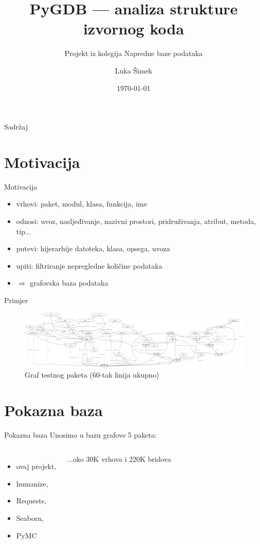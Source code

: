 \documentclass{beamer}
\title[PyGDB]{PyGDB --- analiza strukture izvornog koda}
\subtitle{Projekt iz kolegija Napredne baze podataka}
\author{Luka Šimek}
\institute[PMF--MO]{Prirodoslovno-matematički fakultet --- Matematički odsjek\\Sveučilište u Zagrebu}
\date{\today}
\begin{document}

\begin{frame}[plain]
\titlepage
\end{frame}

\begin{frame}{Sadržaj}
\tableofcontents
\end{frame}

\section{Motivacija}
\begin{frame}{Motivacija}
\begin{itemize}
\item vrhovi: paket, modul, klasa, funkcija, ime
\item odnosi: uvoz, nasljeđivanje, nazivni prostori, pridruživanja, atribut, metoda, tip...
\item putevi: hijerarhije datoteka, klasa, opsega, uvoza
\item upiti: filtriranje nepregledne količine podataka
\item \( \Rightarrow \) grafovska baza podataka
\end{itemize}
\end{frame}

\begin{frame}{Primjer}
\begin{figure}
\includegraphics[scale=0.1]{assets/testni.png}
\centering
\caption{Graf testnog paketa (60-tak linija ukupno)}
\label{fig:primjer}
\end{figure}
\end{frame}

\section{Pokazna baza}
\begin{frame}{Pokazna baza}
Unosimo u bazu grafove 5 paketa:
\begin{columns}
\begin{itemize}
\item ovaj projekt,
\item humanize,
\item Requests,
\item Seaborn,
\item PyMC
\end{itemize}
...oko 30K vrhova i 220K bridova
\end{columns}
\end{frame}
\end{document}
